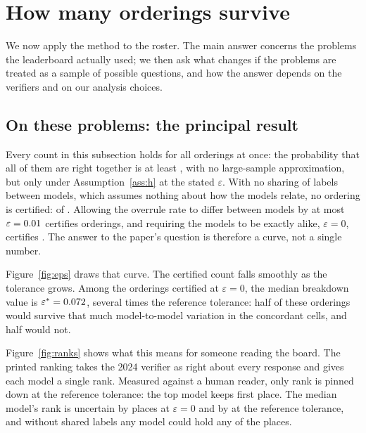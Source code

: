 \section{How many orderings survive}
\label{sec:results}

We now apply the method to the roster. The main answer concerns the \NumItems{} problems the
leaderboard actually used; we then ask what changes if the problems are treated as a sample of
possible questions, and how the answer depends on the verifiers and on our analysis choices.

\subsection{On these problems: the principal result}

Every count in this subsection holds for all \NumOrderings{} orderings at once: the probability that
all of them are right together is at least \FamilyLevelFixed{}, with no large-sample approximation, but only
under Assumption~\ref{ass:h} at the stated $\varepsilon$. With no sharing of labels between models, which assumes nothing about how
the models relate, no ordering is certified: \CertFixedNoPooling{} of \NumOrderings{}. Allowing the
overrule rate to differ between models by at most $\varepsilon = 0.01$ certifies
\CertFixedPrereg{} orderings, and requiring the models to be exactly alike, $\varepsilon = 0$,
certifies \CertFixedEpsZero{}. The answer to the paper's question is therefore a curve, not a single
number.

Figure~\ref{fig:eps} draws that curve. The certified count falls smoothly as the tolerance grows.
Among the orderings certified at $\varepsilon = 0$, the median breakdown value is
$\varepsilon^* = 0.072$, several times the reference tolerance: half of these
orderings would survive that much model-to-model variation in the concordant cells, and half would
not.

Figure~\ref{fig:ranks} shows what this means for someone reading the board. The printed ranking
takes the 2024 verifier as right about every response and gives each model a single rank. Measured
against a human reader, only \RanksResolvedPrereg{} rank is pinned down at the reference tolerance:
the top model keeps first place. The median model's rank is uncertain by \RankWidthMedianEpsZero{}
places at $\varepsilon = 0$ and by \RankWidthMedianPrereg{} at the reference tolerance, and without
shared labels any model could hold any of the \NumModels{} places.

